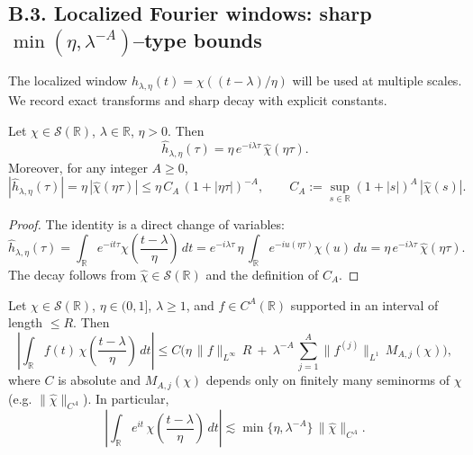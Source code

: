\subsection*{B.3. Localized Fourier windows: sharp $\min(\eta,\lambda^{-A})$–type bounds}
\label{appB:locFourier}

The localized window $h_{\lambda,\eta}(t)=\chi\!\left((t-\lambda)/\eta\right)$ will be used at multiple scales. We record exact transforms and sharp decay with explicit constants.

\begin{lemma}
\label{lem:window-FT}
Let $\chi\in \mathcal{S}(\mathbb{R})$, $\lambda\in\mathbb{R}$, $\eta>0$. Then
\[
\widehat{h}_{\lambda,\eta}(\tau)=\eta\, e^{-i\lambda \tau}\, \widehat{\chi}(\eta \tau).
\]
Moreover, for any integer $A\ge0$,
\[
|\widehat{h}_{\lambda,\eta}(\tau)|
= \eta\, |\widehat{\chi}(\eta\tau)|
\le \eta\, C_A \,(1+|\eta \tau|)^{-A},\qquad
C_A := \sup_{s\in\mathbb{R}} (1+|s|)^A\, |\widehat{\chi}(s)|.
\]
\end{lemma}

\begin{proof}
The identity is a direct change of variables:
\[
\widehat{h}_{\lambda,\eta}(\tau)=\int_{\mathbb{R}} e^{-i t \tau}\chi\!\left(\frac{t-\lambda}{\eta}\right)\,dt
= e^{-i\lambda \tau}\,\eta\, \int_{\mathbb{R}} e^{-i u (\eta\tau)} \chi(u)\,du
= \eta\, e^{-i\lambda \tau}\,\widehat{\chi}(\eta\tau).
\]
The decay follows from $\widehat{\chi}\in \mathcal{S}(\mathbb{R})$ and the definition of $C_A$.
\end{proof}

\begin{lemma}
\label{lem:min-eta-lambdaA}
Let $\chi\in \mathcal{S}(\mathbb{R})$, $\eta\in(0,1]$, $\lambda\ge1$, and $f\in C^{A}(\mathbb{R})$ supported in an interval of length $\le R$. Then
\[
\left| \int_{\mathbb{R}} f(t)\, \chi\!\left(\frac{t-\lambda}{\eta}\right)\,dt \right|
\le C\Big( \eta\, \|f\|_{L^\infty}\, R \ +\ \lambda^{-A}\, \sum_{j=1}^{A} \|f^{(j)}\|_{L^1}\, M_{A,j}(\chi) \Big),
\]
where $C$ is absolute and $M_{A,j}(\chi)$ depends only on finitely many seminorms of $\chi$ (e.g. $\|\widehat{\chi}\|_{C^{A}}$). In particular,
\[
\left| \int_{\mathbb{R}} e^{i t}\, \chi\!\left(\frac{t-\lambda}{\eta}\right)\,dt \right|
\lesssim \min\{\eta,\lambda^{-A}\}\, \|\widehat{\chi}\|_{C^{A}}.
\]
\end{lemma}

